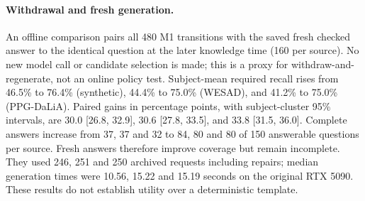 \documentclass[runningheads]{llncs}
\begin{document}
\paragraph{Withdrawal and fresh generation.}
An offline comparison pairs all 480 M1 transitions with the saved fresh checked
answer to the identical question at the later knowledge time (160 per source).
No new model call or candidate selection is made; this is a proxy for
withdraw-and-regenerate, not an online policy test. Subject-mean required recall
rises from 46.5\% to 76.4\% (synthetic), 44.4\% to 75.0\% (WESAD), and 41.2\%
to 75.0\% (PPG-DaLiA). Paired gains in percentage points, with subject-cluster
95\% intervals, are 30.0 [26.8, 32.9], 30.6 [27.8, 33.5], and 33.8 [31.5, 36.0].
Complete answers increase from 37, 37 and 32 to 84, 80 and 80 of 150 answerable
questions per source. Fresh answers therefore improve coverage but remain
incomplete. They used 246, 251 and 250 archived requests including repairs;
median generation times were 10.56, 15.22 and 15.19 seconds on the original
RTX 5090. These results do not establish utility over a deterministic template.
\end{document}
